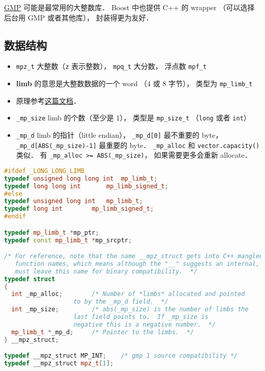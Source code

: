 
\href{https://gmplib.org/}{GMP} 可能是最常用的大整数库． Boost 中也提供 C++ 的 wrapper （可以选择后台用 GMP 或者其他库）， 封装得更为友好．

\subsection{数据结构}
\begin{itemize}
\item \verb|mpz_t| 大整数（\verb|z| 表示整数）， \verb|mpq_t| 大分数， 浮点数 \verb|mpf_t|
\item \textbf{limb} 的意思是大整数数据的一个 word （4 或 8 字节）， 类型为 \verb|mp_limb_t|
\item 原理参考\href{https://gmplib.org/manual/Integer-Internals#Integer-Internals}{这篇文档}．
\item \verb|_mp_size| limb 的个数（至少是 1）， 类型是 \verb|mp_size_t| （\verb|long| 或者 \verb|int|）
\item \verb|_mp_d| limb 的指针（little endian）， \verb|_mp_d[0]| 最不重要的 byte， \verb|_mp_d[ABS(_mp_size)-1]| 最重要的 byte．
\verb|_mp_alloc| 和 \verb|vector.capacity()| 类似． 有 \verb|_mp_alloc >= ABS(_mp_size)|， 如果需要更多会重新 allocate．
\end{itemize}

\begin{lstlisting}[language=cpp]
#ifdef _LONG_LONG_LIMB
typedef unsigned long long int	mp_limb_t;
typedef long long int		mp_limb_signed_t;
#else
typedef unsigned long int	mp_limb_t;
typedef long int		mp_limb_signed_t;
#endif

typedef mp_limb_t *mp_ptr;
typedef const mp_limb_t *mp_srcptr;

/* For reference, note that the name __mpz_struct gets into C++ mangled
   function names, which means although the "__" suggests an internal, we
   must leave this name for binary compatibility.  */
typedef struct
{
  int _mp_alloc;		/* Number of *limbs* allocated and pointed
				   to by the _mp_d field.  */
  int _mp_size;			/* abs(_mp_size) is the number of limbs the
				   last field points to.  If _mp_size is
				   negative this is a negative number.  */
  mp_limb_t *_mp_d;		/* Pointer to the limbs.  */
} __mpz_struct;

typedef __mpz_struct MP_INT;    /* gmp 1 source compatibility */
typedef __mpz_struct mpz_t[1];
\end{lstlisting}
